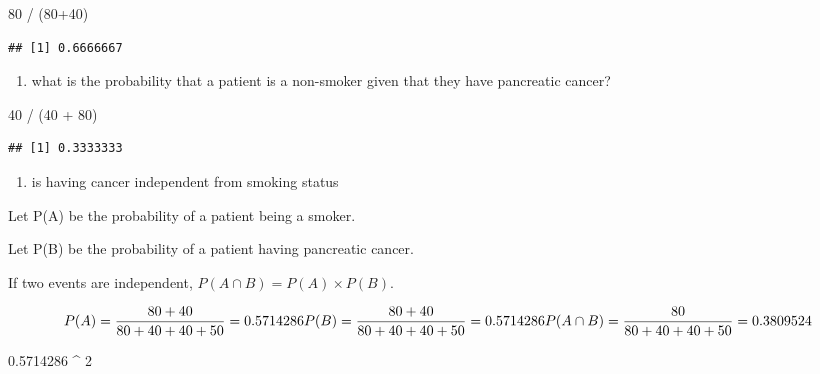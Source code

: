 \documentclass[
]{article}
\newenvironment{Shaded}{\begin{snugshade}}{\end{snugshade}}
\newcommand{\DecValTok}[1]{\textcolor[rgb]{0.00,0.00,0.81}{#1}}
\newcommand{\FloatTok}[1]{\textcolor[rgb]{0.00,0.00,0.81}{#1}}
\newcommand{\NormalTok}[1]{#1}
\newcommand{\SpecialCharTok}[1]{\textcolor[rgb]{0.00,0.00,0.00}{#1}}
\providecommand{\tightlist}{%
  \setlength{\itemsep}{0pt}\setlength{\parskip}{0pt}}
\begin{document}
\begin{Shaded}
\begin{Highlighting}[]
\DecValTok{80} \SpecialCharTok{/}\NormalTok{ (}\DecValTok{80}\SpecialCharTok{+}\DecValTok{40}\NormalTok{)}
\end{Highlighting}
\end{Shaded}

\begin{verbatim}
## [1] 0.6666667
\end{verbatim}

\begin{enumerate}
\def\labelenumi{\alph{enumi})}
\setcounter{enumi}{3}
\tightlist
\item
  what is the probability that a patient is a non-smoker given that they
  have pancreatic cancer?
\end{enumerate}

\begin{Shaded}
\begin{Highlighting}[]
\DecValTok{40} \SpecialCharTok{/}\NormalTok{ (}\DecValTok{40} \SpecialCharTok{+} \DecValTok{80}\NormalTok{)}
\end{Highlighting}
\end{Shaded}

\begin{verbatim}
## [1] 0.3333333
\end{verbatim}

\begin{enumerate}
\def\labelenumi{\alph{enumi})}
\setcounter{enumi}{4}
\tightlist
\item
  is having cancer independent from smoking status
\end{enumerate}

Let P(A) be the probability of a patient being a smoker.

Let P(B) be the probability of a patient having pancreatic cancer.

If two events are independent,
\(P\left( A\cap B\right) =P\left( A\right) \times P\left( B\right)\).

\[
P(A) = \frac{80+40}{80+40+40+50} = 0.5714286 \\
P(B) = \frac{80+40}{80+40+40+50} = 0.5714286 \\
P(A\cap B) = \frac{80}{80+40+40+50} = 0.3809524
\]

\begin{Shaded}
\begin{Highlighting}[]
\FloatTok{0.5714286} \SpecialCharTok{\^{}} \DecValTok{2}
\end{Highlighting}
\end{Shaded}
\end{document}
